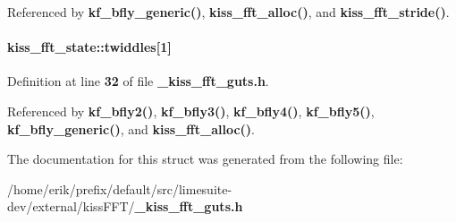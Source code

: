 Referenced by {\bf kf\+\_\+bfly\+\_\+generic()}, {\bf kiss\+\_\+fft\+\_\+alloc()}, and {\bf kiss\+\_\+fft\+\_\+stride()}.

\paragraph[{twiddles}]{ kiss\+\_\+fft\+\_\+state\+::twiddles[1]}\label{structkiss__fft__state_aa7d1cab86ec03a8ecddfe0d91ef0bd20}


Definition at line {\bf 32} of file {\bf \+\_\+kiss\+\_\+fft\+\_\+guts.\+h}.



Referenced by {\bf kf\+\_\+bfly2()}, {\bf kf\+\_\+bfly3()}, {\bf kf\+\_\+bfly4()}, {\bf kf\+\_\+bfly5()}, {\bf kf\+\_\+bfly\+\_\+generic()}, and {\bf kiss\+\_\+fft\+\_\+alloc()}.



The documentation for this struct was generated from the following file\+:\begin{DoxyCompactItemize}
\item 
/home/erik/prefix/default/src/limesuite-\/dev/external/kiss\+F\+F\+T/{\bf \+\_\+kiss\+\_\+fft\+\_\+guts.\+h}\end{DoxyCompactItemize}
